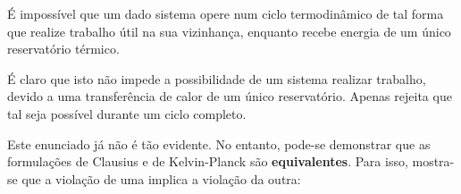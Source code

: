 \begin{theorem} \label{thm:kelvin-planck}
    É impossível que um dado sistema opere num ciclo termodinâmico de tal forma que realize trabalho útil na sua vizinhança, enquanto recebe energia de um único reservatório térmico.
\end{theorem}

É claro que isto não impede a possibilidade de um sistema realizar trabalho, devido a uma transferência de calor de um único reservatório. Apenas rejeita que tal seja possível durante um ciclo completo.

Este enunciado já não é tão evidente. No entanto, pode-se demonstrar que as formulações de Clausius e de Kelvin-Planck são \textbf{equivalentes}. Para isso, mostra-se que a violação de uma implica a violação da outra:

